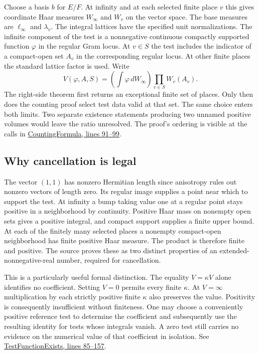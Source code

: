 \documentclass[12pt,letterpaper]{article}
\begin{document}
Choose a basis $b$ for $E/F$. At infinity and at each selected finite place $v$ this gives coordinate Haar measures $W_\infty$ and $W_v$ on the vector space. The base measures are $\ell_\infty$ and $\lambda_v$. The integral lattices have the specified unit normalizations. The infinite component of the test is a nonnegative continuous compactly supported function $\varphi$ in the regular Gram locus. At $v\in S$ the test includes the indicator of a compact-open set $A_v$ in the corresponding regular locus. At other finite places the standard lattice factor is used. Write
\[
 V(\varphi,A,S)=
 \left(\int\varphi\,dW_\infty\right)
 \prod_{v\in S}W_v(A_v).
\]
The right-side theorem first returns an exceptional finite set of places. Only then does the counting proof select test data valid at that set. The same choice enters both limits. Two separate existence statements producing two unnamed positive volumes would leave the ratio unresolved. The proof's ordering is visible at the calls in \href{https://github.com/nousentllc/riemann-hypothesis/blob/40e56bab026552e089d7afcfeff08d2defb9c005/src/Development/AutomorphicSpectrum/Proofs/BlockDecomposition/CountingFormula.lean#L91-L99}{CountingFormula, lines 91--99}.

\subsection{Why cancellation is legal}
The vector $(1,1)$ has nonzero Hermitian length since anisotropy rules out nonzero vectors of length zero. Its regular image supplies a point near which to support the test. At infinity a bump taking value one at a regular point stays positive in a neighborhood by continuity. Positive Haar mass on nonempty open sets gives a positive integral, and compact support supplies a finite upper bound. At each of the finitely many selected places a nonempty compact-open neighborhood has finite positive Haar measure. The product is therefore finite and positive. The source proves these as two distinct properties of an extended-nonnegative-real number, required for cancellation.

This is a particularly useful formal distinction. The equality $V=\kappa V$ alone identifies no coefficient. Setting $V=0$ permits every finite $\kappa$. At $V=\infty$ multiplication by each strictly positive finite $\kappa$ also preserves the value. Positivity is consequently insufficient without finiteness. One may choose a conveniently positive reference test to determine the coefficient and subsequently use the resulting identity for tests whose integrals vanish. A zero test still carries no evidence on the numerical value of that coefficient in isolation. See \href{https://github.com/nousentllc/riemann-hypothesis/blob/40e56bab026552e089d7afcfeff08d2defb9c005/src/Development/AutomorphicSpectrum/Proofs/BlockDecomposition/TestFunctionExists.lean#L85-L157}{TestFunctionExists, lines 85--157}.
\end{document}
